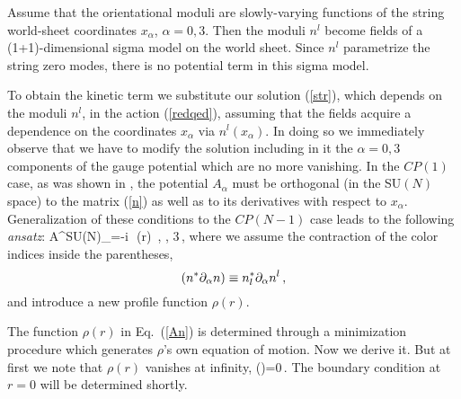 Assume  that the orientational moduli
are slowly-varying functions of the string world-sheet coordinates
$x_{\alpha}$, $\alpha=0,3$. Then the moduli $n^l$ become fields of a 
(1+1)-dimensional sigma model on the world sheet. Since 
$n^l$ parametrize the string zero modes,
there is no potential term in this sigma model. 

To obtain the kinetic term  we substitute our solution
(\ref{str}), which depends on the
moduli $ n^l$,
in the action (\ref{redqed}), assuming  that
the fields acquire a dependence on the coordinates $x_{\alpha}$ via 
$n^l(x_{\alpha})$.
In doing so we immediately observe that we have to modify the solution
including in it the $\alpha=0,3$ components of the gauge potential
which are no more vanishing. In the $CP(1)$ case, as was  shown in 
\cite{ShifmanYung},  the potential $A_{\alpha}$ must be orthogonal 
(in the SU$(N)$  space)  to the matrix (\ref{n}) as well as to its 
derivatives with respect to
$x_{\alpha}$. Generalization of these conditions to the $CP(N-1)$ case 
leads to the 
following {\em ansatz}:
\beq
A^{{\rm SU}(N)}_{\alpha}=-i\,   \,\rho (r)\, , \qquad {}, 3\,,
\label{An}
\eeq
where we assume the contraction of the color indices inside the parentheses,
$$(n^*\partial_{\alpha} n)\equiv n^*_l\partial_{\alpha} n^l\,, $$
and introduce a new profile function $\rho (r)$. 

The function $\rho (r)$ in Eq.~(\ref{An}) is
determined  through a minimization procedure  \cite{Auzzi,ShifmanYung}
which generates $\rho$'s own equation of motion. Now we derive it.
But at first we note that
 $\rho (r)$ vanishes at infinity,
\beq
\rho (\infty)=0\,.
\label{bcfinfty}
\eeq
The boundary condition at $r=0$ will be determined shortly.

